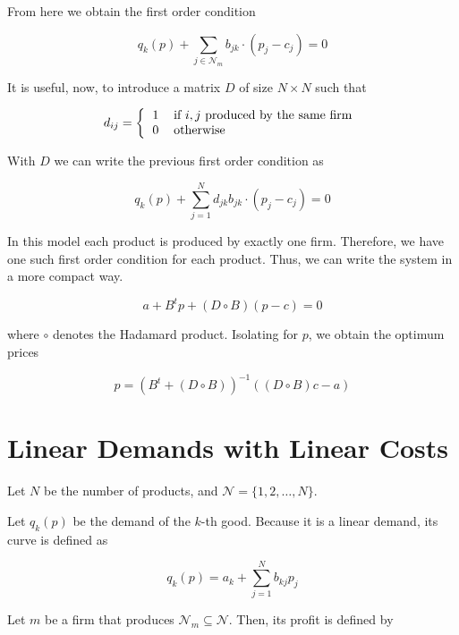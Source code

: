 \documentclass{tfg}
\begin{document}
From here we obtain the first order condition

\begin{equation*}
q_k(p) + \sum_{j \in \mathcal{N}_m} b_{jk} \cdot (p_j - c_j) = 0
\end{equation*}

It is useful, now, to introduce a matrix $D$ of size $N \times N$ such that

\begin{equation*}
d_{ij} = \left\{
\begin{tabular}{ll}
1 & if $i,j$ produced by the same firm\\
0 & otherwise
\end{tabular}\right.
\end{equation*}

With $D$ we can write the previous first order condition as

\begin{equation*}
q_k(p) + \sum_{j = 1}^N d_{jk}b_{jk} \cdot (p_j - c_j) = 0
\end{equation*}

In this model each product is produced by exactly one firm. Therefore, we have one such first order condition for each product. Thus, we can write the system in a more compact way. 

\begin{equation*}
a + B^t p + (D \circ B)(p - c) = 0
\end{equation*}

where $\circ$ denotes the Hadamard product.
Isolating for $p$, we obtain the optimum prices

\begin{equation*}
p = (B^t + (D \circ B))^{-1}((D \circ B) c - a)
\end{equation*}


\section{Linear Demands with Linear Costs}

Let $N$ be the number of products, and $\mathcal{N} = \{1, 2, \dots, N\}$.

Let $q_k (p)$ be the demand of the $k$-th good. Because it is a linear demand, its curve is defined as

\begin{equation*}
q_k(p) = a_k + \sum_{j=1}^N b_{kj}p_j
\end{equation*}

Let $m$ be a firm that produces $\mathcal{N}_m \subseteq \mathcal{N}$. Then, its profit is defined by
\end{document}
